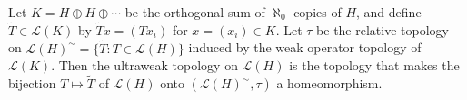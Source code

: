 \begin{proposition}
Let $K = H \oplus H \oplus \cdots$ be the orthogonal sum of $\aleph_0$ copies of $H$, and define $\tilde{T} \in \mathcal{L}(K)$ by $\tilde{T}x = (Tx_i)$ for $x = (x_i) \in K$. Let $\tau$ be the relative topology on $\mathcal{L}(H)^{\sim} = \{\tilde{T} : T \in \mathcal{L}(H)\}$ induced by the weak operator topology of $\mathcal{L}(K)$. Then the ultraweak topology on $\mathcal{L}(H)$ is the topology that makes the bijection $T \mapsto \tilde{T}$ of $\mathcal{L}(H)$ onto $(\mathcal{L}(H)^{\sim}, \tau)$ a homeomorphism.
\end{proposition}
